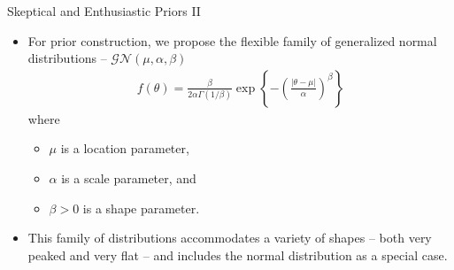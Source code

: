 \documentclass{beamer}
\begin{document}
\begin{frame}{Skeptical and Enthusiastic Priors II}
\begin{itemize}
\item For prior construction, we propose the flexible family of generalized normal distributions -- $\mathcal{GN}(\mu,\alpha,\beta)$
\begin{align*}
f(\theta)=\frac{\beta}{2\alpha\Gamma(1/\beta)}\exp\left\{-\left(\frac{|\theta-\mu|}{\alpha}\right)^\beta\right\}
\end{align*} where 
		\begin{itemize}
					  \vspace{0.2cm}
						\item $\mu$ is a location parameter, 
						
						\vspace{0.2cm}
						\item $\alpha$ is a scale parameter, and 
													
						\vspace{0.2cm}							
						\item $\beta>0$ is a shape parameter.		
		\end{itemize} 
	
	\vspace{0.3cm}	
	\item This family of distributions accommodates a variety of shapes -- both very peaked and very flat -- and includes the normal distribution as a special case.
\end{itemize}
\end{frame}
\end{document}
